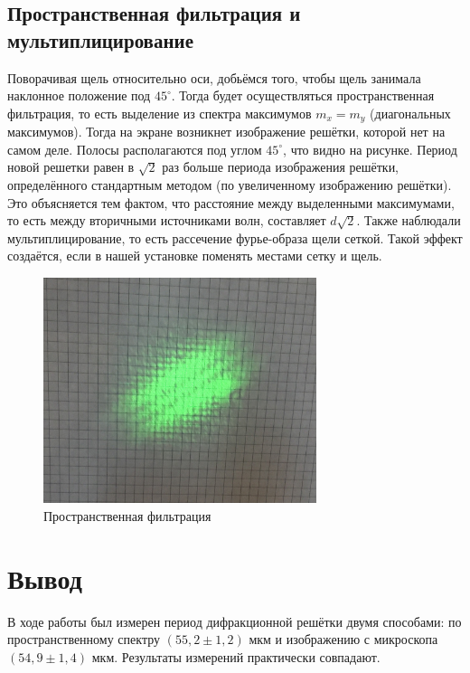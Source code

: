\documentclass[a4paper,12pt]{article} %
\begin{document}
\subsection{Пространственная фильтрация и мультиплицирование}

\noindent Поворачивая щель относительно оси, добьёмся того, чтобы щель занимала наклонное положение под $45^\circ$. Тогда будет осуществляться пространственная фильтрация, то есть выделение из спектра максимумов $m_x = m_y$ (диагональных максимумов). Тогда на экране возникнет изображение решётки, которой нет на самом деле. Полосы располагаются под углом $45^\circ$, что видно на рисунке. Период новой решетки равен в $\sqrt{2}$ раз больше периода изображения решётки, определённого стандартным методом (по увеличенному изображению решётки). Это объясняется тем фактом, что расстояние между выделенными максимумами, то есть между вторичными источниками волн, составляет $d\sqrt{2}$. Также наблюдали мультиплицирование, то есть рассечение фурье-образа щели сеткой. Такой эффект создаётся, если в нашей установке поменять местами сетку и щель.

\begin{figure}[h]
    \centering
    \includegraphics[width=8cm]{3.jpg}
    \caption{Пространственная фильтрация}
    \label{filtr}
\end{figure}



\newpage


\section{Вывод}

\noindent В ходе работы был измерен период дифракционной решётки двумя  способами: по пространственному спектру $(55,2 \pm 1,2) \text{ мкм}$ и изображению с микроскопа $(54,9 \pm 1,4) \text{ мкм}$. Результаты измерений практически совпадают. 
\end{document}
